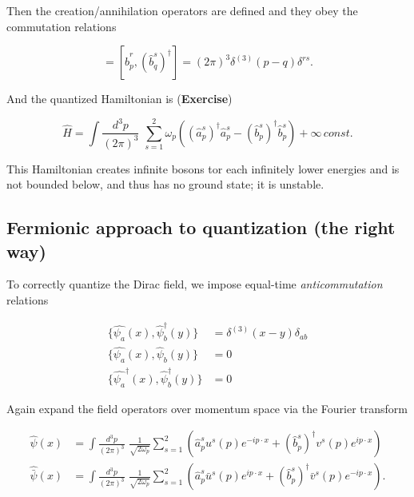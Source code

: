 \noindent Then the creation/annihilation operators are defined and they obey the commutation relations

\begin{equation}
[\hat{a}^r_p, (\hat{b}^s_q)^\dagger ] = [\hat{b}_p^r, (\hat{b}^s_q)^\dagger ] = (2\pi)^3 \delta^{(3)}(p-q) \delta^{rs}.
\end{equation}

\noindent And the quantized Hamiltonian is (\textbf{Exercise})

\begin{equation}
\hat{H} = \int \frac{d^3 p}{(2 \pi)^3} \,\,  \sum_{s=1}^2 \omega_p \left( (\hat{a}_p^s)^\dagger \hat{a}_p^s - (\hat{b}_p^s)^\dagger \hat{b}_p^s \right) + \infty \, const.
\end{equation}

\noindent This Hamiltonian creates infinite bosons tor each infinitely lower energies and is not bounded below, and thus has no ground state; it is unstable.

\subsection*{Fermionic approach to quantization (the right way)}

\noindent To correctly quantize the Dirac field, we impose equal-time \textit{anticommutation} relations

\begin{align}
\{ \hat{\psi_a} (x), \hat{\psi}_b^\dagger (y) \} &= \delta^{(3)} (x-y) \delta_{ab} \\
\{ \hat{\psi_a} (x), \hat{\psi}_b (y) \} &= 0 \\
\{ \hat{\psi_a}^\dagger (x), \hat{\psi}_b^\dagger (y) \} &= 0 
\end{align}

\noindent Again expand the field operators over momentum space via the Fourier transform

\begin{align}
\hat{\psi} (x) &= \int \frac{d^3 p}{(2 \pi)^3} \,\, \frac{1}{\sqrt{2 \omega_p}} \sum_{s=1}^2 \left( \hat{a}_p^s u^s(p) e^{-i p \cdot x} + (\hat{b}_{p}^s)^\dagger v^s(p) e^{i p \cdot x} \right) \\
\hat{\bar{\psi}} (x) &= \int \frac{d^3 p}{(2 \pi)^3} \,\, \frac{1}{\sqrt{2 \omega_p}} \sum_{s=1}^2 \left( \hat{a}_p^s \bar{u}^s(p) e^{i p \cdot x} + (\hat{b}_{p}^s)^\dagger \bar{v}^s(p) e^{-i p \cdot x} \right).
\end{align}

